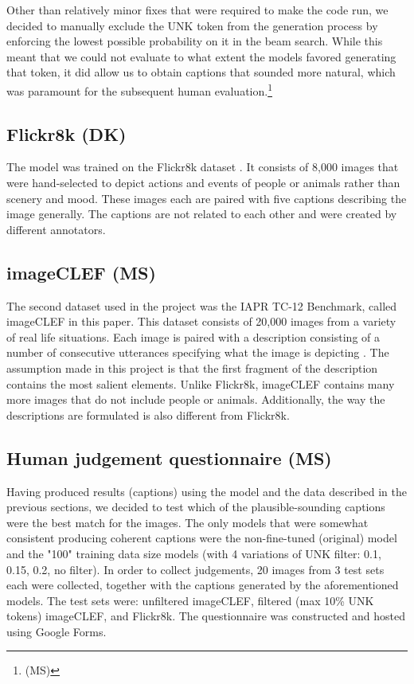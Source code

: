 \documentclass[11pt]{article}
\begin{document}
Other than relatively minor fixes that were required to make the code run, we decided to manually exclude the UNK token from the generation process by enforcing the lowest possible probability on it in the beam search. While this meant that we could not evaluate to what extent the models favored generating that token, it did allow us to obtain captions that sounded more natural, which was paramount for the subsequent human evaluation.\footnote{(MS)}

\subsection{Flickr8k (DK)}

The model was trained on the Flickr8k dataset \cite{flickr8k}. It consists of 8,000 images that were hand-selected to depict actions and events of people or animals rather than scenery and mood. These images each are paired with five captions describing the image generally. The captions are not related to each other and were created by different annotators.

\subsection{imageCLEF (MS)}

The second dataset used in the project was the IAPR TC-12 Benchmark, called imageCLEF in this paper. This dataset consists of 20,000 images from a variety of real life situations. Each image is paired with a description consisting of a number of consecutive utterances specifying what the image is depicting \cite{imageclef}. The assumption made in this project is that the first fragment of the description contains the most salient elements. Unlike Flickr8k, imageCLEF contains many more images that do not include people or animals. Additionally, the way the descriptions are formulated is also different from Flickr8k.

\subsection{Human judgement questionnaire (MS)}

Having produced results (captions) using the model and the data described in the previous sections, we decided to test which of the plausible-sounding captions were the best match for the images. The only models that were somewhat consistent producing coherent captions were the non-fine-tuned (original) model and the "100" training data size models (with 4 variations of UNK filter: 0.1, 0.15, 0.2, no filter). In order to collect judgements, 20 images from 3 test sets each were collected, together with the captions generated by the aforementioned models. The test sets were: unfiltered imageCLEF, filtered (max 10\% UNK tokens) imageCLEF, and Flickr8k. The questionnaire was constructed and hosted using Google Forms.
\end{document}
